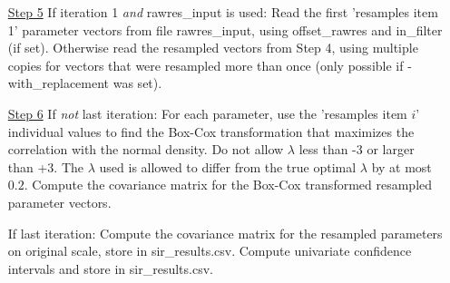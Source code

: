 \begin{itemize}
\item[\underline{Step 5}]
If iteration 1 \emph{and} rawres\_input is used: Read the first 'resamples item 1' parameter vectors
from file rawres\_input, using offset\_rawres and in\_filter (if set).
Otherwise read the resampled vectors from Step 4, using multiple copies for vectors that were resampled more than once (only possible if -with\_replacement was set).
\item[\underline{Step 6}]
If \emph{not} last iteration: 
For each parameter, use the 'resamples item $i$' individual values to find the Box-Cox transformation that maximizes the correlation with the normal density.
Do not allow $\lambda$ less than -3 or larger than +3. The  $\lambda$ used is allowed to differ from the true optimal  $\lambda$
by at most $0.2$.
Compute the covariance matrix for the Box-Cox transformed resampled parameter vectors.

\noindent If last iteration: 
Compute the covariance matrix for the resampled parameters on original scale, 
store in sir\_results.csv. 
Compute univariate confidence intervals and store in sir\_results.csv.
\end{itemize}

